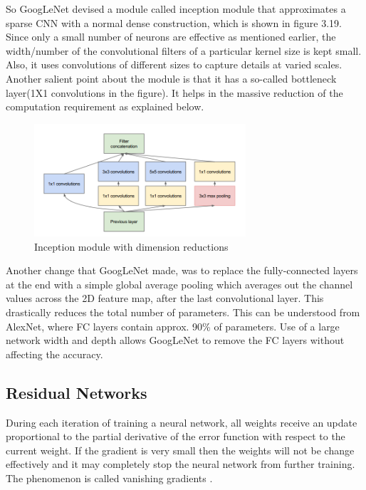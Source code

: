 So GoogLeNet devised a module called inception module that approximates a sparse CNN with a normal dense construction, which is shown in figure 3.19. Since only a small number of neurons are effective as mentioned earlier, the width/number of the convolutional filters of a particular kernel size is kept small. Also, it uses convolutions of different sizes to capture details at varied scales. Another salient point about the module is that it has a so-called bottleneck layer(1X1 convolutions in the figure). It helps in the massive reduction of the computation requirement as explained below.
\begin{figure}[h]
	\includegraphics[width=0.7\textwidth]{Figures/Section3_Inception.png} 
	\centering
	\captionsetup{justification=centering}
	\caption{Inception module with dimension reductions}
	\label{fig:inception}
\end{figure}
Another change that GoogLeNet made, was to replace the fully-connected layers at the end with a simple global average pooling which averages out the channel values across the 2D feature map, after the last convolutional layer. This drastically reduces the total number of parameters. This can be understood from AlexNet, where FC layers contain approx. 90\% of parameters. Use of a large network width and depth allows GoogLeNet to remove the FC layers without affecting the accuracy.

\subsection{Residual Networks}
During each iteration of training a neural network, all weights receive an update proportional to the partial derivative of the error function with respect to the current weight. If the gradient is very small then the weights will not be change effectively and it may completely stop the neural network from further training. The phenomenon is called vanishing gradients  \cite{hochreiter1998vanishing}.


